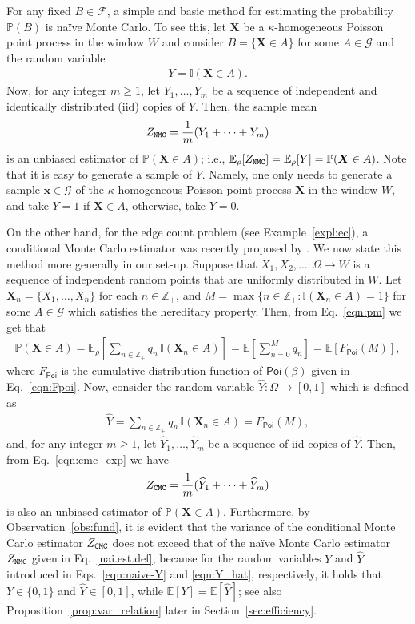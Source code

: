 \documentclass[pdflatex, sn-mathphys-ay]{sn-jnl}%
\newcommand{\intg}{\mathbb{Z}}
\newcommand{\ind}{\mathbb{I}}
\newcommand{\mc}{\mathcal}
\newcommand{\mscr}{\mathscr}
\renewcommand{\v}[1]{\boldsymbol{#1}}
\newcommand{\pp}{\mathbb{P}}
\newcommand{\ee}{\mathbb{E}}
\newcommand{\poi}{\textsf{Poi}}
\newcommand{\mx}{\v{x}}
\newcommand{\mX}{\v{X}}
\newcommand{\scG}{\mathscr{G}}
\newcommand{\lt}{\left}
\newcommand{\rt}{\right}
\newcommand{\wh}{\widehat}
\theoremstyle{thmstyleone}%
\theoremstyle{thmstyletwo}%
\theoremstyle{thmstylethree}%
\begin{document}
For any fixed  $B\in\mscr{F}$,
a simple and basic method for estimating the probability
$ \pp(B)$ 
 is  na\"{i}ve Monte Carlo.
To see this, let $\mX$ be a $\kappa$-homogeneous Poisson point process in the window $W$ and consider ${B=\{\mX \in A\}}$ for some 
 $A \in  \mc G$ and the random variable
\begin{align}
 Y = \ind(\mX \in A).
 \label{eqn:naive-Y}
\end{align}
Now, for any integer $m\ge 1$, let $Y_1, \dots, Y_m$ be a sequence of independent and identically distributed (iid) copies of $Y$. Then, the sample mean 
\begin{align}\label{nai.est.def}
Z_{\tt NMC} = \frac{1}{m}(Y_1 + \cdots + Y_m)
\end{align}
is an unbiased estimator of  $\pp(\mX \in A)$; i.e., $ \ee_\rho[Z_{\tt NMC}] = \ee_\rho[Y] = \pp(\mX \in A)$. Note that it is easy to generate  a sample of $Y$. Namely, one only needs to generate a sample
$\mx \in \scG$ 
of the $\kappa$-homogeneous Poisson point process $\mX$ in the window $W$, 
and take $Y = 1$ if $\mX \in A$, otherwise, take $Y = 0$.


On the other hand, for the edge count problem (see Example~\ref{expl:ec}), a  
conditional Monte Carlo estimator was recently proposed by \cite{HMTK20}. We now state this method more generally in our set-up. Suppose that $X_1, X_2, \ldots:\Omega\to W$ is a sequence of independent  random points that are uniformly distributed in $W$.  Let $\mX_n = \{X_1, \ldots, X_n\}$ for each $n  \in \intg_+$, and 
$
	M = \max \{n  \in \intg_+: \ind(\mX_n \in A) = 1\}
$ for some 
 $A \in  \mc G$ which satisfies the hereditary property.
Then, from Eq.~\eqref{eqn:pm} we get that
\begin{align}
\pp(\mX \in A) = \ee_\rho\lt[ \sum_{n \in \intg_+} q_n\, \ind(\mX_n \in A) \rt]= \ee\lt[ \sum_{n = 0}^M q_n \rt]
      = \ee\lt[ F_{\poi}(M) \rt],
	\label{eqn:cmc_exp} 
\end{align}
where $F_{\poi}$
is the cumulative distribution function of $\poi(\beta)$
given in Eq.~\eqref{eqn:Fpoi}.
Now, consider the random variable $\wh Y:\Omega\to[0,1]$  which is defined as
\begin{align}
\label{eqn:Y_hat}
\wh Y = \sum_{n \in \intg_+} q_n\, \ind(\mX_n \in A) =F_{\poi}(M),
\end{align} 
and,  for any integer $m\ge 1$, let $\wh Y_1, \dots, \wh Y_m$ be a sequence of iid copies of $\wh Y$. 
Then, from Eq.~\eqref{eqn:cmc_exp} we have
\begin{align}
\label{cmc.est.def}
Z_{\tt CMC} = \frac{1}{m}(\wh Y_1 + \cdots + \wh Y_m)
\end{align}
is also an unbiased estimator of  $\pp(\mX \in A)$.
Furthermore, by  Observation~\ref{obs:fund}, it is evident that the variance of the conditional Monte Carlo estimator $Z_{\tt CMC}$ does not exceed that 
of the na\"{i}ve Monte Carlo estimator $Z_{\tt NMC}$ given in Eq.~\eqref{nai.est.def}, because for the random variables $Y$ and $\wh Y$ introduced in Eqs.~\eqref{eqn:naive-Y}
and \eqref{eqn:Y_hat}, respectively, it holds that
$Y \in \{0,1 \}$ and $\widehat Y \in [0,1]$, while $\ee[Y] = \ee[\widehat Y]$; see also Proposition~\ref{prop:var_relation} later in Section~\ref{sec:efficiency}. 
\end{document}
